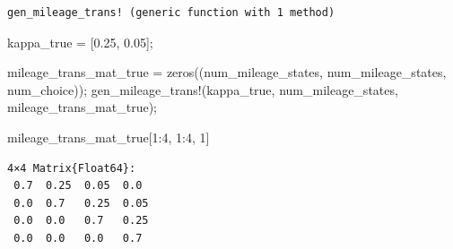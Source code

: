 \documentclass[
  letterpaper,
  DIV=11,
  numbers=noendperiod]{scrreprt}
\newenvironment{Shaded}{\begin{snugshade}}{\end{snugshade}}
\newcommand{\FloatTok}[1]{\textcolor[rgb]{0.68,0.00,0.00}{#1}}
\newcommand{\FunctionTok}[1]{\textcolor[rgb]{0.28,0.35,0.67}{#1}}
\newcommand{\NormalTok}[1]{\textcolor[rgb]{0.00,0.23,0.31}{#1}}
\newcommand{\OperatorTok}[1]{\textcolor[rgb]{0.37,0.37,0.37}{#1}}
\begin{document}
\begin{verbatim}
gen_mileage_trans! (generic function with 1 method)
\end{verbatim}

\begin{Shaded}
\begin{Highlighting}[]
\NormalTok{kappa\_true }\OperatorTok{=}\NormalTok{ [}\FloatTok{0.25}\NormalTok{, }\FloatTok{0.05}\NormalTok{];}

\NormalTok{mileage\_trans\_mat\_true }\OperatorTok{=} \FunctionTok{zeros}\NormalTok{((num\_mileage\_states, num\_mileage\_states, num\_choice));}
\FunctionTok{gen\_mileage\_trans!}\NormalTok{(kappa\_true, num\_mileage\_states, mileage\_trans\_mat\_true);}

\NormalTok{mileage\_trans\_mat\_true[}\FloatTok{1}\OperatorTok{:}\FloatTok{4}\NormalTok{, }\FloatTok{1}\OperatorTok{:}\FloatTok{4}\NormalTok{, }\FloatTok{1}\NormalTok{]}
\end{Highlighting}
\end{Shaded}

\begin{verbatim}
4×4 Matrix{Float64}:
 0.7  0.25  0.05  0.0
 0.0  0.7   0.25  0.05
 0.0  0.0   0.7   0.25
 0.0  0.0   0.0   0.7
\end{verbatim}
\end{document}
